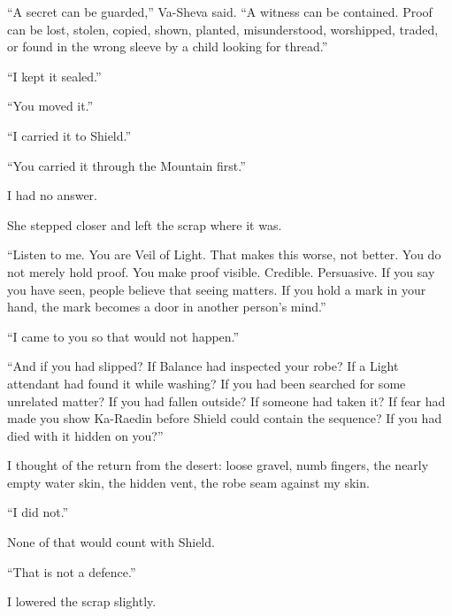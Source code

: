 \ornament

``A secret can be guarded,'' Va-Sheva said. ``A witness can be contained. Proof can be lost, stolen, copied, shown, planted, misunderstood, worshipped, traded, or found in the wrong sleeve by a child looking for thread.''\par

``I kept it sealed.''\par

``You moved it.''\par

``I carried it to Shield.''\par

``You carried it through the Mountain first.''\par

I had no answer.\par

She stepped closer and left the scrap where it was.\par

``Listen to me. You are Veil of Light. That makes this worse, not better. You do not merely hold proof. You make proof visible. Credible. Persuasive. If you say you have seen, people believe that seeing matters. If you hold a mark in your hand, the mark becomes a door in another person's mind.''\par

``I came to you so that would not happen.''\par

``And if you had slipped? If Balance had inspected your robe? If a Light attendant had found it while washing? If you had been searched for some unrelated matter? If you had fallen outside? If someone had taken it? If fear had made you show Ka-Raedin before Shield could contain the sequence? If you had died with it hidden on you?''\par

I thought of the return from the desert: loose gravel, numb fingers, the nearly empty water skin, the hidden vent, the robe seam against my skin.\par

``I did not.''\par

None of that would count with Shield.\par

``That is not a defence.''\par

I lowered the scrap slightly.\par

